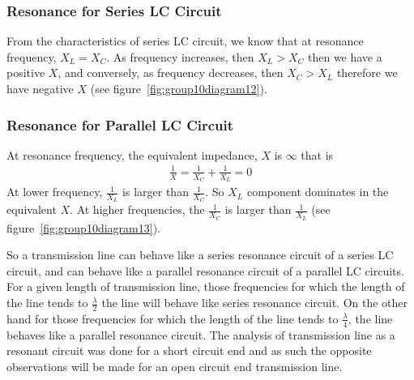 \subsubsection{Resonance for Series LC Circuit}
From the characteristics of series LC circuit, we know that at resonance frequency, $X_L = X_C$. As frequency increases, then $ X_{L} > X_{C} $ then we have a positive $X$, and conversely, as frequency decreases, then $ X_{C} > X_{L} $ therefore we have negative $X$ (see figure~\ref{fig:group10diagram12}).

\subsubsection{Resonance for Parallel LC Circuit}
At resonance frequency, the equivalent impedance, $X$ is $\infty$ that is
\begin{align*}
\frac{1}{X} = \frac{1}{X_{C}} + \frac{1}{X_{L}} = 0
\end{align*}
At lower frequency, $ \frac{1}{X_{L}} $ is larger than $ \frac{1}{X_{C}} $. So $ X_{L} $ component dominates in the equivalent $X$. At higher frequencies, the $\frac{1}{X_C}$ is larger than $\frac{1}{X_L}$ (see figure~\ref{fig:group10diagram13}).

So a transmission line can behave like a series resonance circuit of a series LC circuit, and can behave like a parallel resonance circuit of a parallel LC circuits. For a given length of transmission line, those frequencies for which the length of the line tends to $ \frac{\lambda}{2} $ the line will behave like series resonance circuit. On the other hand for those frequencies for which the length of the line tends to $ \frac{\lambda}{4} $, the line behaves like a parallel resonance circuit. The analysis of transmission line as a resonant circuit was done for a short circuit end and as such the opposite observations will be made for an open circuit end transmission line.

